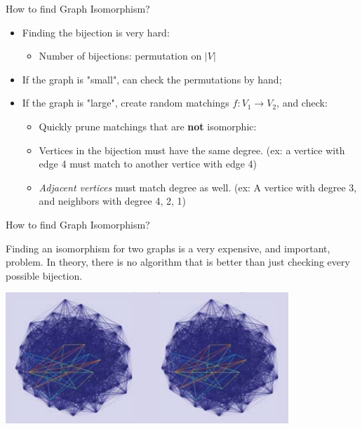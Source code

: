 \begin{frame}{How to find Graph Isomorphism?}
    \begin{itemize}
      \item Finding the bijection is very hard:
      \begin{itemize}
        \item Number of bijections: permutation on $|V|$
      \end{itemize}\bigskip

    \item If the graph is "small", can check the permutations by hand;\bigskip

    \item If the graph is "large", create random matchings $f: V_1 \rightarrow V_2$, and check:
      \begin{itemize}
        \item Quickly prune matchings that are {\bf not} isomorphic:
        \item Vertices in the bijection must have the same degree. (ex: a vertice with edge 4 must match to another vertice with edge 4)
        \item \emph{Adjacent vertices} must match degree as well. (ex: A vertice with degree 3, and neighbors with degree 4, 2, 1)
      \end{itemize}
    \end{itemize}
\end{frame}

\begin{frame}{How to find Graph Isomorphism?}

  Finding an isomorphism for two graphs is a very expensive, and important, problem. In theory, there is no algorithm that is better than just checking every possible bijection.

  \begin{center}
    \includegraphics[width=0.8\textwidth]{../img/isomorphism}
  \end{center}
\end{frame}
